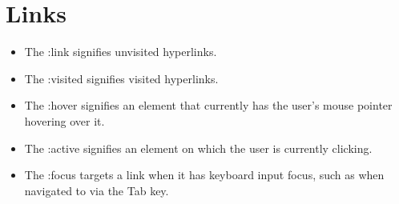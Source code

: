 \documentclass{report}
\begin{document}
    \bigbreak \noindent 
    \section{\LARGE Links}
    \bigbreak \noindent 
    \begin{itemize}
        \item The :link signifies unvisited hyperlinks.
        \item The :visited signifies visited hyperlinks.
        \item The :hover signifies an element that currently has the user's mouse pointer hovering over it.
        \item The :active signifies an element on which the user is currently clicking.
        \item The :focus targets a link when it has keyboard input focus, such as when navigated to via the Tab key.
    \end{itemize}

    \pagebreak \bigbreak \noindent 
\end{document}

